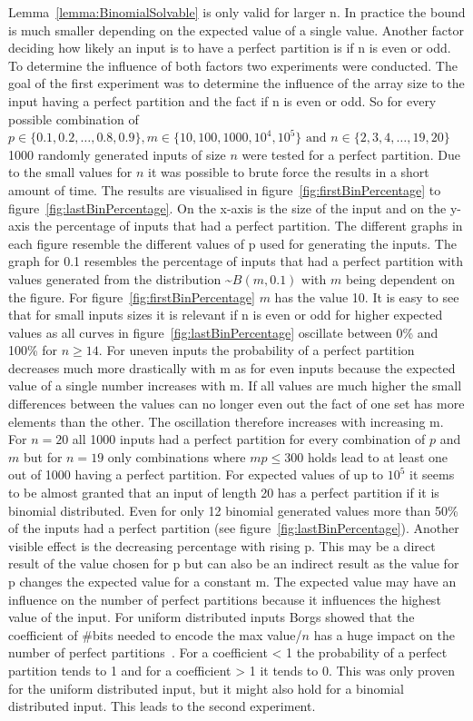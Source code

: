 Lemma~\ref{lemma:BinomialSolvable} is only valid for larger n.
In practice the bound is much smaller depending on the expected value of a single value.
Another factor deciding how likely an input is to have a perfect partition is if n is even or odd.
To determine the influence of both factors two experiments were conducted.
The goal of the first experiment was to determine the influence of the array size to the input having a perfect partition and the fact if n is even or odd.
So for every possible combination of $p \in \{0.1, 0.2, \dots , 0.8, 0.9\}, m \in \{10,100,1000,10^4,10^5\} \text{ and } n \in \{2,3,4,\dots,19,20\}$ 1000 randomly generated inputs of size $n$ were tested for a perfect partition.
Due to the small values for $n$ it was possible to brute force the results in a short amount of time.
The results are visualised in figure~\ref{fig:firstBinPercentage} to figure~\ref{fig:lastBinPercentage}.
On the x-axis is the size of the input and on the y-axis the percentage of inputs that had a perfect partition.
The different graphs in each figure resemble the different values of p used for generating the inputs.
The graph for 0.1 resembles the percentage of inputs that had a perfect partition with values generated from the distribution \textasciitilde$B(m,0.1)$ with $m$ being dependent on the figure.
For figure~\ref{fig:firstBinPercentage} $m$ has the value 10.\newline
It is easy to see that for small inputs sizes it is relevant if n is even or odd for higher expected values as all curves in figure~\ref{fig:lastBinPercentage} oscillate between 0\% and 100\% for $n\ge14$.
For uneven inputs the probability of a perfect partition decreases much more drastically with m as for even inputs because the expected value of a single number increases with m.
If all values are much higher the small differences between the values can no longer even out the fact of one set has more elements than the other.
The oscillation therefore increases with increasing m.
For $n=20$ all 1000 inputs had a perfect partition for every combination of $p$ and $m$ but for $n=19$ only combinations where $mp\le300$ holds lead to at least one out of 1000 having a perfect partition.
For expected values of up to $10^5$ it seems to be almost granted that an input of length 20 has a perfect partition if it is binomial distributed.
Even for only 12 binomial generated values more than 50\% of the inputs had a perfect partition (see figure~\ref{fig:lastBinPercentage}).
Another visible effect is the decreasing percentage with rising p.
This may be a direct result of the value chosen for p but can also be an indirect result as the value for p changes the expected value for a constant m.
The expected value may have an influence on the number of perfect partitions because it influences the highest value of the input.
For uniform distributed inputs Borgs showed that the coefficient of \#bits needed to encode the max value/$n$ has a huge impact on the number of perfect partitions~\cite{borgs2001phase}.
For a coefficient < 1 the probability of a perfect partition tends to 1 and for a coefficient > 1 it tends to 0.
This was only proven for the uniform distributed input, but it might also hold for a binomial distributed input.
This leads to the second experiment.

